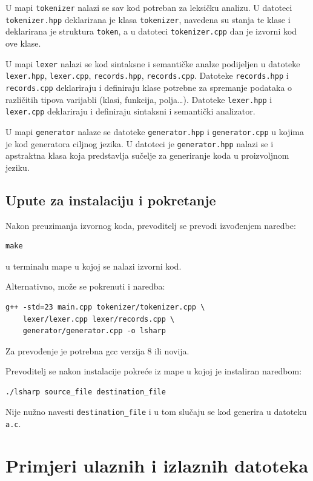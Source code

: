 \documentclass[times, utf8, zavrsni]{fer}
\begin{document}
U mapi \verb|tokenizer| nalazi se sav kod potreban za leksičku analizu. U datoteci \linebreak \verb|tokenizer.hpp| deklarirana je
klasa \verb|tokenizer|, navedena su stanja te klase i deklarirana je struktura \verb|token|, a u datoteci \verb|tokenizer.cpp|
dan je izvorni kod ove klase.

U mapi \verb|lexer| nalazi se kod sintaksne i semantičke analze podijeljen u datoteke \verb|lexer.hpp|, \verb|lexer.cpp|, \verb|records.hpp|, \verb|records.cpp|.
Datoteke \linebreak \verb|records.hpp| i \verb|records.cpp| deklariraju i definiraju klase potrebne za spremanje podataka o različitih tipova varijabli (klasi, funkcija, polja\dots).
Datoteke \verb|lexer.hpp| i \verb|lexer.cpp| deklariraju i definiraju sintaksni i semantički analizator.

U mapi \verb|generator| nalaze se datoteke \verb|generator.hpp| i \verb|generator.cpp| u kojima je kod generatora ciljnog jezika.
U datoteci je \verb|generator.hpp| nalazi se i apstraktna klasa koja predstavlja sučelje za generiranje koda u proizvoljnom jeziku.

\section{Upute za instalaciju i pokretanje}
Nakon preuzimanja izvornog koda, prevoditelj se prevodi izvođenjem naredbe:
\begin{verbatim}
make
\end{verbatim}
u terminalu mape u kojoj se nalazi izvorni kod. 

Alternativno, može se pokrenuti i naredba:
\begin{verbatim}
g++ -std=23 main.cpp tokenizer/tokenizer.cpp \
    lexer/lexer.cpp lexer/records.cpp \
    generator/generator.cpp -o lsharp
\end{verbatim}

Za prevođenje je potrebna gcc verzija 8 ili novija.

Prevoditelj se nakon instalacije pokreće iz mape u kojoj je instaliran naredbom:
\begin{verbatim}
./lsharp source_file destination_file
\end{verbatim}
Nije nužno navesti \verb|destination_file| i u tom slučaju se kod generira u datoteku \verb|a.c|.

\chapter{Primjeri ulaznih i izlaznih datoteka} %
\end{document}
